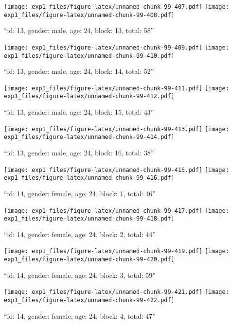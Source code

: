 \documentclass[,]{article}
\begin{document}
\texttt{[image: exp1\_files/figure-latex/unnamed-chunk-99-407.pdf]}
\texttt{[image: exp1\_files/figure-latex/unnamed-chunk-99-408.pdf]}

\newpage
[1] 

``id: 13, gender: male, age: 24, block: 13, total: 58''

\texttt{[image: exp1\_files/figure-latex/unnamed-chunk-99-409.pdf]}
\texttt{[image: exp1\_files/figure-latex/unnamed-chunk-99-410.pdf]}

\newpage
[1] 

``id: 13, gender: male, age: 24, block: 14, total: 52''

\texttt{[image: exp1\_files/figure-latex/unnamed-chunk-99-411.pdf]}
\texttt{[image: exp1\_files/figure-latex/unnamed-chunk-99-412.pdf]}

\newpage
[1] 

``id: 13, gender: male, age: 24, block: 15, total: 43''

\texttt{[image: exp1\_files/figure-latex/unnamed-chunk-99-413.pdf]}
\texttt{[image: exp1\_files/figure-latex/unnamed-chunk-99-414.pdf]}

\newpage
[1] 

``id: 13, gender: male, age: 24, block: 16, total: 38''

\texttt{[image: exp1\_files/figure-latex/unnamed-chunk-99-415.pdf]}
\texttt{[image: exp1\_files/figure-latex/unnamed-chunk-99-416.pdf]}

\newpage
[1] 

``id: 14, gender: female, age: 24, block: 1, total: 46''

\texttt{[image: exp1\_files/figure-latex/unnamed-chunk-99-417.pdf]}
\texttt{[image: exp1\_files/figure-latex/unnamed-chunk-99-418.pdf]}

\newpage
[1] 

``id: 14, gender: female, age: 24, block: 2, total: 44''

\texttt{[image: exp1\_files/figure-latex/unnamed-chunk-99-419.pdf]}
\texttt{[image: exp1\_files/figure-latex/unnamed-chunk-99-420.pdf]}

\newpage
[1] 

``id: 14, gender: female, age: 24, block: 3, total: 59''

\texttt{[image: exp1\_files/figure-latex/unnamed-chunk-99-421.pdf]}
\texttt{[image: exp1\_files/figure-latex/unnamed-chunk-99-422.pdf]}

\newpage
[1] 

``id: 14, gender: female, age: 24, block: 4, total: 47''
\end{document}
